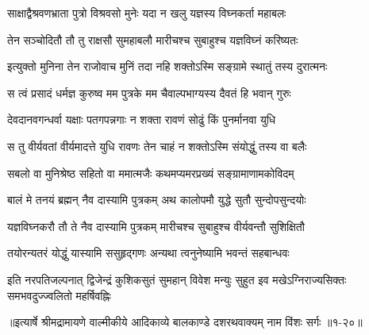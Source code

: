 \twolineshloka
{साक्षाद्वैश्रवणभ्राता पुत्रो विश्रवसो मुनेः}
{यदा न खलु यज्ञस्य विघ्नकर्ता महाबलः} %

\twolineshloka
{तेन सञ्चोदितौ तौ तु राक्षसौ सुमहाबलौ}
{मारीचश्च सुबाहुश्च यज्ञविघ्नं करिष्यतः} %

\twolineshloka
{इत्युक्तो मुनिना तेन राजोवाच मुनिं तदा}
{नहि शक्तोऽस्मि सङ्ग्रामे स्थातुं तस्य दुरात्मनः} %

\twolineshloka
{स त्वं प्रसादं धर्मज्ञ कुरुष्व मम पुत्रके}
{मम चैवाल्पभाग्यस्य दैवतं हि भवान् गुरुः} %

\twolineshloka
{देवदानवगन्धर्वा यक्षाः पतगपन्नगाः}
{न शक्ता रावणं सोढुं किं पुनर्मानवा युधि} %

\twolineshloka
{स तु वीर्यवतां वीर्यमादत्ते युधि रावणः}
{तेन चाहं न शक्तोऽस्मि संयोद्धुं तस्य वा बलैः} %

\twolineshloka
{सबलो वा मुनिश्रेष्ठ सहितो वा ममात्मजैः}
{कथमप्यमरप्रख्यं सङ्ग्रामाणामकोविदम्} %

\twolineshloka
{बालं मे तनयं ब्रह्मन् नैव दास्यामि पुत्रकम्}
{अथ कालोपमौ युद्धे सुतौ सुन्दोपसुन्दयोः} %

\twolineshloka
{यज्ञविघ्नकरौ तौ ते नैव दास्यामि पुत्रकम्}
{मारीचश्च सुबाहुश्च वीर्यवन्तौ सुशिक्षितौ} %

\twolineshloka
{तयोरन्यतरं योद्धुं यास्यामि ससुहृद्गणः}
{अन्यथा त्वनुनेष्यामि भवन्तं सहबान्धवः} %

\twolineshloka
{इति नरपतिजल्पनात् द्विजेन्द्रं कुशिकसुतं सुमहान् विवेश मन्युः}
{सुहुत इव मखेऽग्निराज्यसिक्तः समभवदुज्ज्वलितो महर्षिवह्निः} %


॥इत्यार्षे श्रीमद्रामायणे वाल्मीकीये आदिकाव्ये बालकाण्डे दशरथवाक्यम् नाम विंशः सर्गः ॥१-२०॥
